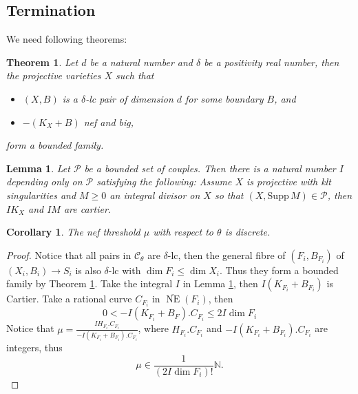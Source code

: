 \documentclass{article}
\newtheorem{lem}[defn]{Lemma}
\newtheorem{thm}[defn]{Theorem}
\newtheorem{cor}[defn]{Corollary}
\begin{document}
\subsection{Termination}
We need following theorems:
\begin{thm}\label{BAB}
  \cite[Theorem 1.1]{birkarSingularitiesLinearSystems2020} Let $ d $ be a natural number and $ \delta $ be a positivity real number, then the projective varieties $ X $ such that  \begin{itemize}
    \item  $ (X,B) $ is a $ \delta $-lc pair of dimension $ d $ for some boundary $ B $, and
      \item   $ -(K_X+B) $ nef and big,
  \end{itemize}
  form a bounded family.
\end{thm}
\begin{lem}\label{effeciveindex}
  \cite[Lemma 2.24]{birkarAntipluricanonicalSystemsFano2019} Let $ \mathcal{P} $ be  a bounded set of couples. Then there is  a natural number $ I $ depending only on $ \mathcal{P} $ satisfying the following: Assume $ X $ is projective with klt singularities and $ M\geqslant 0 $ an integral divisor on $ X $ so that $ (X,\mathrm{Supp}\, M)\in \mathcal{P} $, then $ IK_X $ and $ IM $ are cartier.
\end{lem}
\begin{cor}\label{Discreteness}
  The nef threshold $ \mu $ with respect to $ \theta $ is discrete.
\end{cor}
\begin{proof}
  Notice that all pairs in $ \mathcal{C}_\theta $ are $ \delta $-lc, then the general fibre  of $(F_{i},B_{F_{i}})$ of  $(X_{i},B_{i})\to S_{i}$ is  also $\delta$-lc with $\dim F_{i}\leqslant \dim X_{i}$. Thus they form a bounded family by Theorem \ref{BAB}. Take the integral $ I $ in  Lemma \ref{effeciveindex}, then $ I(K_{F_{i}}+B_{F_{i}}) $ is Cartier. Take a rational curve $ C_{F_{i}} $ in $ \overline{\operatorname{NE}}(F_{i}) $, then
  \[ 0<-I(K_{F_{i}}+B_{F}).C_{F_{i}}\leqslant 2I\dim F_{i} \]
  Notice that $ \mu=\frac{IH_{F_{i}}.C_{F_{i}}}{-I(K_{F_{i}}+B_{F_{i}}).C_{F_{i}}} $, where $ H_{F_{i}}.C_{F_{i}} $ and $ -I(K_{F_{i}}+B_{F_{i}}).C_{F_{i}} $ are integers, thus 
  \[ \mu\in \frac{1}{(2I\dim F_{i})!}\mathbb{N}.  \] \end{proof}
\end{document}
